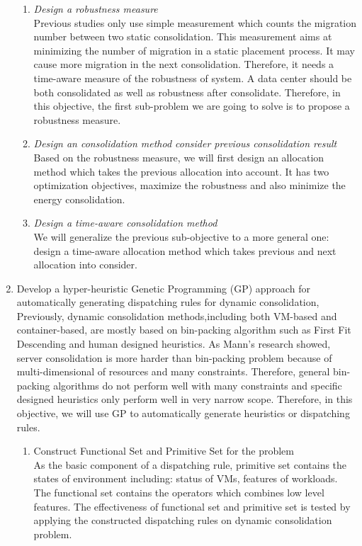 \begin{enumerate}
\begin{enumerate}
		\item \emph{Design a robustness measure} \\
 		Previous studies only use simple measurement which counts the migration number between two static consolidation. This measurement aims at minimizing the number of migration in a static placement process. It may cause more migration in the next consolidation. Therefore, it needs a time-aware measure of the robustness of system. A data center should be both consolidated as well as robustness after consolidate. Therefore, in this objective, the first sub-problem we are going to solve is to propose a robustness measure.
		\item \emph{Design an consolidation method consider previous consolidation result} \\
		Based on the robustness measure, we will first design an allocation method which takes the previous allocation into account. It has two optimization objectives, maximize the robustness and also minimize the energy consolidation.
		\item \emph{Design a time-aware consolidation method}\\
		We will generalize the previous sub-objective to a more general one: design a time-aware allocation method which takes previous and next allocation into consider.
	\end{enumerate}

	\item  Develop a hyper-heuristic Genetic Programming (GP) approach for automatically generating dispatching rules for dynamic consolidation,
	Previously, dynamic consolidation methods,including both VM-based and container-based, are mostly based on bin-packing algorithm such as First Fit Descending and human designed heuristics. As Mann's research \cite{Mann:2015ua} showed, server consolidation is more harder than bin-packing problem because of multi-dimensional of resources and many constraints. Therefore, general bin-packing algorithms do not perform well with many constraints and specific designed heuristics only perform well in very narrow scope. Therefore, in this objective, we will use GP to automatically generate heuristics or dispatching rules.
	\begin{enumerate}
		\item Construct Functional Set and Primitive Set for the problem \\
		As the basic component of a dispatching rule, primitive set contains the states of environment including: status of VMs, features of workloads. The functional set contains the operators which combines low level features. The effectiveness of functional set and primitive set is tested by applying the constructed dispatching rules on dynamic consolidation problem.


\end{enumerate}
\end{enumerate}
